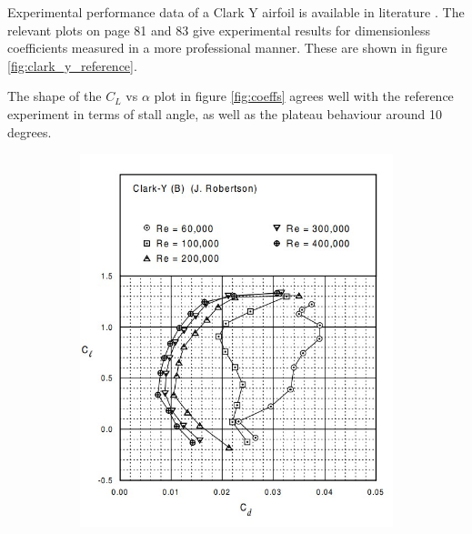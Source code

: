 \documentclass[runningheads]{llncs}
\begin{document}
\noindent
Experimental performance data of a Clark Y airfoil is available in literature
\cite{lyon_broeren_giguere_gopalarathnam_selig_1997}. The relevant plots on page 81 and 83 give experimental results for dimensionless coefficients measured in a more professional manner. These are shown in figure \ref{fig:clark_y_reference}.\newline

\noindent
The shape of the $C_L$ vs $\alpha$ plot in figure \ref{fig:coeffs} agrees well with the reference experiment in terms of stall angle, as well as the plateau behaviour around 10 degrees.

\begin{figure}[h]
    \centering
    \begin{subfigure}[b]{0.45\textwidth}
         \centering
         \includegraphics[width=\textwidth]{figures/clark_y_reference_cl_cd.jpg}
         \caption{}
         \label{fig:reference_cl_cd}
     \end{subfigure}
     \begin{subfigure}[b]{0.45\textwidth}
         \centering

\end{subfigure}
\end{figure}
\end{document}
